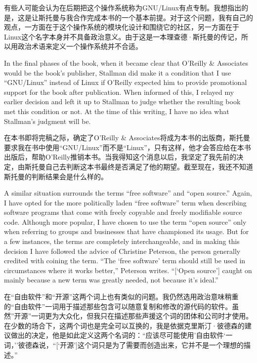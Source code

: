 \ifdefined\chs
有些人可能会认为在后期把这个操作系统称为GNU/Linux有点专制。我想指出的是，这是让斯托曼与我合作完成本书的一个基本前提。对于这个问题，我有自己的观点，一方面在于这个操作系统的模块化设计和围绕它的社区，另一方面在于Linux这个名字本身并不具备政治意义。由于这是一本理查德·斯托曼的传记，所以用政治术语来定义一个操作系统并不合适。
\fi

\ifdefined\eng
In the final phases of the book, when it became clear that O'Reilly \& Associates would be the book's publisher, Stallman did make it a condition that I use ``GNU/Linux'' instead of Linux if O'Reilly expected him to provide promotional support for the book after publication. When informed of this, I relayed my earlier decision and left it up to Stallman to judge whether the resulting book met this condition or not. At the time of this writing, I have no idea what Stallman's judgment will be.
\fi

\ifdefined\chs
在本书即将完稿之际，确定了O'Reilly \& Associates将成为本书的出版商，斯托曼要求我在书中使用``GNU/Linux''而不是``Linux''，只有这样，他才会答应给在本书出版后，帮助O'Reilly推销本书。当我得知这个消息以后，我坚定了我先前的决定，由斯托曼自己去判断这本书最终是否满足了他的期望。截至现在，我还不知道斯托曼的判断结果会是什么样的。
\fi

\ifdefined\eng
A similar situation surrounds the terms ``free software'' and ``open source.'' Again, I have opted for the more politically laden ``free software'' term when describing software programs that come with freely copyable and freely modifiable source code. Although more popular, I have chosen to use the term ``open source'' only when referring to groups and businesses that have championed its usage. But for a few instances, the terms are completely interchangeable, and in making this decision I have followed the advice of Christine Peterson, the person generally credited with coining the term. ``The `free software' term should still be used in circumstances where it works better,'' Peterson writes. ``[`Open source'] caught on mainly because a new term was greatly needed, not because it's ideal.''
\fi

\ifdefined\chs
在``自由软件''和``开源''这两个词上也有类似的问题。我仍然选用政治意味稍重的``自由软件''一词用于描述那些包含可以随意复制和修改的源代码的软件。虽然''开源''一词更为大众化，但我只在描述那些声援这个词的团体和公司时才使用。在少数的场合下，这两个词也是完全可以互换的，我是依据克里斯汀·彼德森的建议做出的决定，他是如此定义这两个名词的：``应该尽可能使用'自由软件`一词，''彼德森说，``[`开源']这个词只是为了需要而创造出来，它并不是一个理想的描述。''
\fi

\setcounter{endnote}{0}

